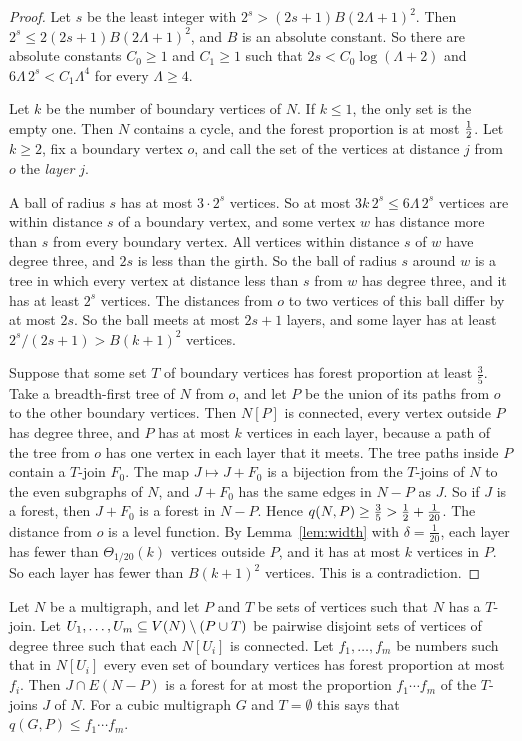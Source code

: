 \begin{proof}
Let $s$ be the least integer with $2^{s}>(2s+1)B(2\Lambda+1)^{2}$. Then
$2^{s}\le2(2s+1)B(2\Lambda+1)^{2}$, and $B$ is an absolute constant. So there are absolute
constants $C_0\ge1$ and $C_1\ge1$ such that $2s<C_0\log(\Lambda+2)$ and $6\Lambda\,2^{s}<C_1\Lambda^{4}$
for every $\Lambda\ge4$.

Let $k$ be the number of boundary vertices of $N$. If $k\le1$, the only set is the empty one.
Then $N$ contains a cycle, and the forest proportion is at most $\tfrac12$. Let $k\ge2$, fix a
boundary vertex $o$, and call the set of the vertices at distance $j$ from $o$ the \emph{layer}
$j$.

 A ball of radius $s$ has at most $3\cdot2^{s}$ vertices. So at most
$3k\,2^{s}\le6\Lambda\,2^{s}$ vertices are within distance $s$ of a boundary vertex, and some
vertex $w$ has distance more than $s$ from every boundary vertex. All vertices within distance
$s$ of $w$ have degree three, and $2s$ is less than the girth. So the ball of radius $s$ around
$w$ is a tree in which every vertex at distance less than $s$ from $w$ has degree three, and it
has at least $2^{s}$ vertices. The distances from $o$ to two vertices of this ball differ by at
most $2s$. So the ball meets at most $2s+1$ layers, and some layer has at least
$2^{s}/(2s+1)>B(k+1)^{2}$ vertices.

 Suppose that some set $T$ of boundary vertices has forest proportion at least
$\frac35$. Take a breadth-first tree of $N$ from $o$, and let $P$ be the union of its paths from
$o$ to the other boundary vertices. Then $N[P]$ is connected, every vertex outside $P$ has degree
three, and $P$ has at most $k$ vertices in each layer, because a path of the tree from $o$ has
one vertex in each layer that it meets. The tree paths inside $P$ contain a $T$-join $F_0$. The
map $J\mapsto J+F_0$ is a bijection from the $T$-joins of $N$ to the even subgraphs of $N$, and
$J+F_0$ has the same edges in $N-P$ as $J$. So if $J$ is a forest, then $J+F_0$ is a forest in
$N-P$. Hence $q(N,P)\ge\frac35>\tfrac12+\frac1{20}$. The distance from $o$ is a level function. By
Lemma~\ref{lem:width} with $\delta=\frac1{20}$, each layer has fewer than $\Theta_{1/20}(k)$
vertices outside $P$, and it has at most $k$ vertices in $P$. So each layer has fewer than
$B(k+1)^{2}$ vertices. This is a contradiction.
\end{proof}

\begin{lemma}[Product]\label{lem:product}
Let $N$ be a multigraph, and let $P$ and $T$ be sets of vertices such that $N$ has a $T$-join. Let
$U_1,\ldots,U_m\subseteq V(N)\setminus(P\cup T)$ be pairwise disjoint sets of vertices of degree three
such that each $N[U_i]$ is connected. Let $f_1,\dots,f_m$ be numbers such that in $N[U_i]$ every
even set of boundary vertices has forest proportion at most $f_i$. Then $J\cap E(N-P)$ is a
forest for at most the proportion $f_1\cdots f_m$ of the $T$-joins $J$ of $N$. For a cubic
multigraph $G$ and $T=\emptyset$ this says that $q(G,P)\le f_1\cdots f_m$.
\end{lemma}

